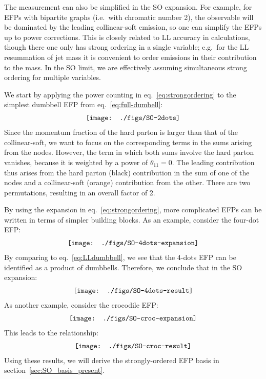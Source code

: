 \documentclass[a4paper,11pt]{article}
\newcommand{\eq}[1]{eq.~\eqref{eq:#1}}
\renewcommand{\sec}[1]{section~\ref{sec:#1}}
\begin{document}
The measurement can also be simplified in the SO expansion.
%
For example, for EFPs with bipartite graphs (i.e.~with chromatic number 2), the observable will be dominated by the leading collinear-soft emission, so one can simplify the EFPs up to power corrections.
%
This is closely related to LL accuracy in calculations, though there one only has strong ordering in a single variable; e.g.~for the LL resummation of jet mass it is convenient to order emissions in their contribution to the mass.
%
In the SO limit, we are effectively assuming simultaneous strong ordering for multiple variables.



We start by applying the power counting in \eq{strongordering} to the simplest dumbbell EFP from \eq{full-dumbell}: 
\begin{align}\label{eq:LLdumbbell}
 \texttt{[image: ./figs/SO-2dots]} \raisetag{2.0\baselineskip}   
\end{align}
Since the momentum fraction of the hard parton is larger than that of the collinear-soft, we want to focus on the corresponding terms in the sums arising from the nodes.
%
However, the term in which both sums involve the hard parton vanishes, because it is weighted by a power of $\theta_{11} = 0$.
%
The leading contribution thus arises from the hard parton (black) contribution in the sum of one of the nodes and a collinear-soft (orange) contribution from the other.
%
There are two permutations, resulting in an overall factor of 2.


By using the expansion in \eq{strongordering}, more complicated EFPs can be written in terms of simpler building blocks.
%
As an example, consider the four-dot EFP:
\begin{align}
 \texttt{[image: ./figs/SO-4dots-expansion]} \raisetag{2.0\baselineskip}   
\end{align}
By comparing to \eq{LLdumbbell}, we see that the 4-dots EFP can be identified as a product of dumbbells.
%
Therefore, we conclude that in the SO expansion:
\begin{align} \label{eq:4dotsSO}
 \texttt{[image: ./figs/SO-4dots-result]} \raisetag{2.0\baselineskip}   
\end{align}
As another example, consider the crocodile EFP:
\begin{align}
 \texttt{[image: ./figs/SO-croc-expansion]} \raisetag{2.0\baselineskip}   
\end{align}
This leads to the relationship:
\begin{align} \label{eq:smallcrocSO}
 \texttt{[image: ./figs/SO-croc-result]} \raisetag{2.0\baselineskip}   
\end{align}
%
Using these results, we will derive the strongly-ordered EFP basis in \sec{SO_basis_present}.
\end{document}
